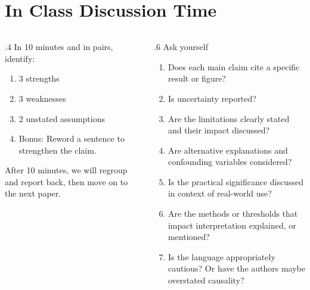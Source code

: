 \documentclass[aspectratio=169]{beamer} %
\begin{document}
\section{In Class Discussion Time}
	\begin{frame}
		\begin{columns}
			\begin{column}{.4\linewidth}
				In 10 minutes and in pairs, identify:
				\begin{enumerate}
					\item 3 strengths
					\item 3 weaknesses
					\item 2 unstated assumptions
					\item Bonus: Reword a sentence to strengthen the claim.
				\end{enumerate}
				After 10 minutes, we will regroup and report back, then move on to the next paper.
			\end{column}
			\begin{column}{.6\linewidth}
				Ask yourself
				\begin{enumerate}
					\item Does each main claim cite a specific result or figure?
					\item Is uncertainty reported?
					\item Are the limitations clearly stated and their impact discussed?
					\item Are alternative explanations and confounding variables considered?
					\item Is the practical significance discussed in context of real-world use?
					\item Are the methods or thresholds that impact interpretation explained, or mentioned?
					\item Is the language appropriately cautious?  Or have the authors maybe overstated causality?
				\end{enumerate}
			\end{column}
		\end{columns}
	\end{frame}
\end{document}
